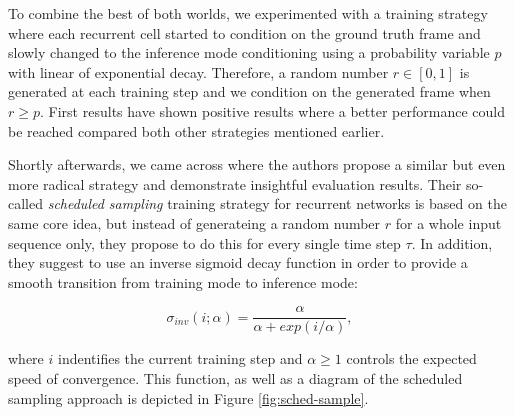 To combine the best of both worlds, we experimented with a training strategy where each recurrent cell started to condition on the ground truth frame and slowly changed to the inference mode conditioning using a probability variable $p$ with linear of exponential decay. Therefore, a random number $r \in [0, 1]$ is generated at each training step and we condition on the generated frame when $r \geq p$. First results have shown positive results where a better performance could be reached compared both other strategies mentioned earlier. 

Shortly afterwards, we came across \parencite{sched_sample} where the authors propose a similar but even more radical strategy and demonstrate insightful evaluation results. Their so-called \textit{scheduled sampling} training strategy for recurrent networks is based on the same core idea, but instead of generateing a random number $r$ for a whole input sequence only, they propose to do this for every single time step $\tau$. In addition, they suggest to use an inverse sigmoid decay function in order to provide a smooth transition from training mode to inference mode:

\begin{equation} \label{eq:inverse-sigmoid}
\sigma_{inv}(i; \alpha) = \frac{\alpha}{\alpha + exp(i / \alpha)} ,
\end{equation}

where $i$ indentifies the current training step and $\alpha \geq 1$ controls the expected speed of convergence. This function, as well as a diagram of the scheduled sampling approach is depicted in Figure \ref{fig:sched-sample}.

